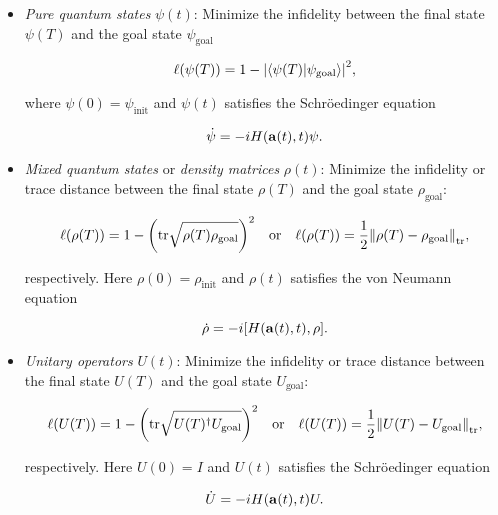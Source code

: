 \documentclass{article}
\begin{document}
\begin{itemize}
  \item \textit{Pure quantum states} $\psi(t)$: Minimize the infidelity between the final state $\psi(T)$ and the goal state $\psi_{\text{goal}}$

  \begin{equation}
    \ell(\psi(T)) = 1 - \abs{\bra{\psi(T)} \ket{\psi_{\text{goal}}}}^2,
  \end{equation}

  where $\psi(0) = \psi_{\text{init}}$ and $\psi(t)$ satisfies the Schr\"oedinger equation

  \begin{equation}
    \dot \psi = -i H(\vb{a}(t), t) \psi.
  \end{equation}


  \item \textit{Mixed quantum states} or \textit{density matrices} $\rho(t)$:  Minimize the infidelity or trace distance between the final state $\rho(T)$ and the goal state $\rho_{\text{goal}}$:

  \begin{equation}
    \ell(\rho(T)) = 1 - \qty(\text{tr}\sqrt{\rho(T) \rho_{\text{goal}}})^2 
    \quad \text{or} \quad
    \ell(\rho(T)) = \frac{1}{2} \norm{\rho(T) - \rho_{\text{goal}}}_{\text{tr}},
  \end{equation}

  respectively. Here $\rho(0) = \rho_{\text{init}}$ and $\rho(t)$ satisfies the von Neumann equation

  \begin{equation}
    \dot \rho = -i \qty[H(\vb{a}(t), t), \rho].
  \end{equation}

  \item \textit{Unitary operators} $U(t)$: Minimize the infidelity or trace distance between the final state $U(T)$ and the goal state $U_{\text{goal}}$:
  
  \begin{equation}
    \ell(U(T)) = 1 - \qty(\text{tr}\sqrt{U(T)^\dagger U_{\text{goal}}})^2 
    \quad \text{or} \quad
    \ell(U(T)) = \frac{1}{2} \norm{U(T) - U_{\text{goal}}}_{\text{tr}},
  \end{equation}

  respectively. Here $U(0) = I$ and $U(t)$ satisfies the Schr\"oedinger equation

  \begin{equation}
    \dot U = -i H(\vb{a}(t), t) U.
  \end{equation}
\end{itemize}
\end{document}
